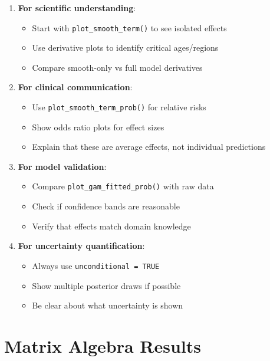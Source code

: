 \documentclass[12pt]{article}
\begin{document}
\begin{enumerate}
   \item \textbf{For scientific understanding}:
   \begin{itemize}
       \item Start with \texttt{plot\_smooth\_term()} to see isolated effects
       \item Use derivative plots to identify critical ages/regions
       \item Compare smooth-only vs full model derivatives
   \end{itemize}
   
   \item \textbf{For clinical communication}:
   \begin{itemize}
       \item Use \texttt{plot\_smooth\_term\_prob()} for relative risks
       \item Show odds ratio plots for effect sizes
       \item Explain that these are average effects, not individual predictions
   \end{itemize}
   
   \item \textbf{For model validation}:
   \begin{itemize}
       \item Compare \texttt{plot\_gam\_fitted\_prob()} with raw data
       \item Check if confidence bands are reasonable
       \item Verify that effects match domain knowledge
   \end{itemize}
   
   \item \textbf{For uncertainty quantification}:
   \begin{itemize}
       \item Always use \texttt{unconditional = TRUE}
       \item Show multiple posterior draws if possible
       \item Be clear about what uncertainty is shown
   \end{itemize}
\end{enumerate}

\appendix

\section{Matrix Algebra Results}
\end{document}
